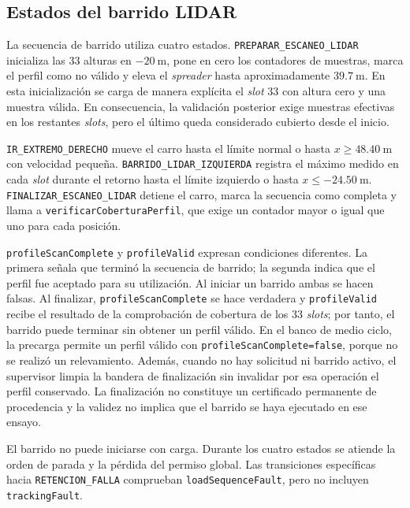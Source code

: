 \documentclass[a4paper,10pt,onecolumn,journal]{ieeeconf}
\numberwithin{equation}{section}
\begin{document}

\subsection{Estados del barrido LIDAR}
La secuencia de barrido utiliza cuatro estados. \texttt{PREPARAR\_ESCANEO\_LIDAR} inicializa las 33 alturas en $-20~\mathrm{m}$, pone en cero los contadores de muestras, marca el perfil como no válido y eleva el \textit{spreader} hasta aproximadamente $39.7~\mathrm{m}$. En esta inicialización se carga de manera explícita el \textit{slot} 33 con altura cero y una muestra válida. En consecuencia, la validación posterior exige muestras efectivas en los restantes \textit{slots}, pero el último queda considerado cubierto desde el inicio.

\texttt{IR\_EXTREMO\_DERECHO} mueve el carro hasta el límite normal o hasta $x\geq48.40~\mathrm{m}$ con velocidad pequeña. \texttt{BARRIDO\_LIDAR\_IZQUIERDA} registra el máximo medido en cada \textit{slot} durante el retorno hasta el límite izquierdo o hasta $x\leq-24.50~\mathrm{m}$. \texttt{FINALIZAR\_ESCANEO\_LIDAR} detiene el carro, marca la secuencia como completa y llama a \texttt{verificarCoberturaPerfil}, que exige un contador mayor o igual que uno para cada posición.

\texttt{profileScanComplete} y \texttt{profileValid} expresan condiciones diferentes. La primera señala que terminó la secuencia de barrido; la segunda indica que el perfil fue aceptado para su utilización. Al iniciar un barrido ambas se hacen falsas. Al finalizar, \texttt{profileScanComplete} se hace verdadera y \texttt{profileValid} recibe el resultado de la comprobación de cobertura de los 33 \textit{slots}; por tanto, el barrido puede terminar sin obtener un perfil válido. En el banco de medio ciclo, la precarga permite un perfil válido con \texttt{profileScanComplete=false}, porque no se realizó un relevamiento. Además, cuando no hay solicitud ni barrido activo, el supervisor limpia la bandera de finalización sin invalidar por esa operación el perfil conservado. La finalización no constituye un certificado permanente de procedencia y la validez no implica que el barrido se haya ejecutado en ese ensayo.

El barrido no puede iniciarse con carga. Durante los cuatro estados se atiende la orden de parada y la pérdida del permiso global. Las transiciones específicas hacia \texttt{RETENCION\_FALLA} comprueban \texttt{loadSequenceFault}, pero no incluyen \texttt{trackingFault}.
\end{document}
